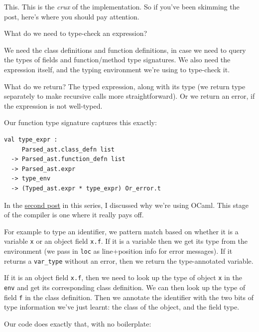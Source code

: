 {{This. This is the \emph{crux} of the implementation. So if you've been
skimming the post, here's where you should pay attention.

What do we need to type-check an expression?

We need the class definitions and function definitions, in case we need
to query the types of fields and function/method type signatures. We
also need the expression itself, and the typing environment we're using
to type-check it.

What do we return? The typed expression, along with its type (we return
type separately to make recursive calls more straightforward). Or we
return an error, if the expression is not well-typed.

Our function type signature captures this exactly:

%

\begin{lstlisting}[language=caml,caption={type\_expr.mli}]
val type_expr :
     Parsed_ast.class_defn list
  -> Parsed_ast.function_defn list
  -> Parsed_ast.expr
  -> type_env
  -> (Typed_ast.expr * type_expr) Or_error.t
\end{lstlisting}

In the
\href{https://mukulrathi.com/create-your-own-programming-language/compiler-engineering-structure/}{second
post} in this series, I discussed why we're using OCaml. This stage of
the compiler is one where it really pays off.

For example to type an identifier, we pattern match based on whether it
is a variable \texttt{x} or an object field \texttt{x.f}. If it is a
variable then we get its type from the environment (we pass in
\texttt{loc} as line+position info for error messages). If it returns a
\texttt{var\_type} without an error, then we return the type-annotated
variable.

If it is an object field \texttt{x.f}, then we need to look up the type
of object \texttt{x} in the \texttt{env} and get its corresponding class
definition. We can then look up the type of field \texttt{f} in the
class definition. Then we annotate the identifier with the two bits of
type information we've just learnt: the class of the object, and the
field type.

Our code does exactly that, with no boilerplate:

}}
